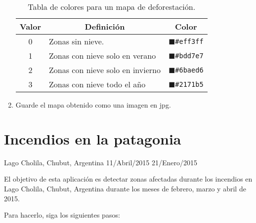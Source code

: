 \begin{enumerate}
\begin{table}[]
\centering
\begin{tabular}{@{}cll@{}}
\toprule
Valor  & \multicolumn{1}{c}{Definición}   & \multicolumn{1}{c}{Color}                       \\ \midrule
0      & Zonas sin nieve.                 & \textcolor{N1}{$\blacksquare$}\texttt{\#eff3ff} \\
1      & Zonas con nieve solo en verano   & \textcolor{N2}{$\blacksquare$}\texttt{\#bdd7e7} \\
2      & Zonas con nieve solo en invierno & \textcolor{N3}{$\blacksquare$}\texttt{\#6baed6} \\
3      & Zonas con nieve todo el año      & \textcolor{N4}{$\blacksquare$}\texttt{\#2171b5} \\ \bottomrule
\end{tabular}
\caption{Tabla de colores para un mapa de deforestación.}
\label{tab:nieve}
\end{table}

\item Guarde el mapa obtenido como una imagen en jpg.
\end{enumerate}

\section{Incendios en la patagonia}

Lago Cholila, Chubut, Argentina
11/Abril/2015
21/Enero/2015

El objetivo de esta aplicación es detectar zonas afectadas durante los incendios en Lago Cholila, Chubut, Argentina durante los meses de febrero, marzo y abril de 2015.

Para hacerlo, siga los siguientes pasos:

